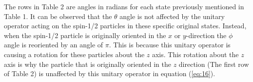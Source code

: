 \documentclass[twocolumn]{article}
\begin{document}
The rows in Table 2 are angles in radians for each state previously mentioned in Table 1. It can be observed that the $\theta$ angle is not affected by the unitary operator acting on the spin-1/2 particles in these specific original states. Instead, when the spin-1/2 particle is originally oriented in the $x$ or $y$-direction the $\phi$ angle is reoriented by an angle of $\pi$. This is because this unitary operator is causing a rotation for these particles about the $z$ axis. This rotation about the $z$ axis is why the particle that is originally oriented in the $z$ direction (The first row of Table 2) is unaffected by this unitary operator in equation (\ref{eq:16}).
\end{document}

